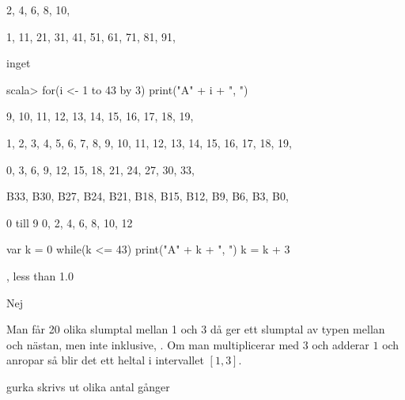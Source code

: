 {{2, 4, 6, 8, 10,

1, 11, 21, 31, 41, 51, 61, 71, 81, 91,

inget

\Subtask 

\begin{REPLnonum}
scala> for(i <- 1 to 43 by 3) print("A" + i + ", ")
\end{REPLnonum}

\Task %

\Subtask 

9, 10, 11, 12, 13, 14, 15, 16, 17, 18, 19,

1, 2, 3, 4, 5, 6, 7, 8, 9, 10, 11, 12, 13, 14, 15, 16, 17, 18, 19,

0, 3, 6, 9, 12, 15, 18, 21, 24, 27, 30, 33,

\Subtask 

B33, B30, B27, B24, B21, B18, B15, B12, B9, B6, B3, B0,

\Task %

\Subtask 

0 till 9
0, 2, 4, 6, 8, 10, 12

\Subtask 

\begin{REPLnonum}
var k = 0
while(k <= 43)
{
print("A" + k + ", ")
k = k + 3
}
\end{REPLnonum}

\Subtask {}

\Task %

\Subtask  {}

, less than 1.0

\Subtask  Nej

\Subtask Man får 20 olika slumptal mellan 1 och 3 då  ger ett slumptal av typen  mellan  och nästan, men inte inklusive, . Om man multiplicerar med $3$ och adderar $1$ och anropar  så blir det ett heltal i intervallet $[1, 3]$.    

\Subtask {}

\Subtask {}

\Subtask {}

\Subtask  gurka skrivs ut olika antal gånger

\Subtask {}

}}

